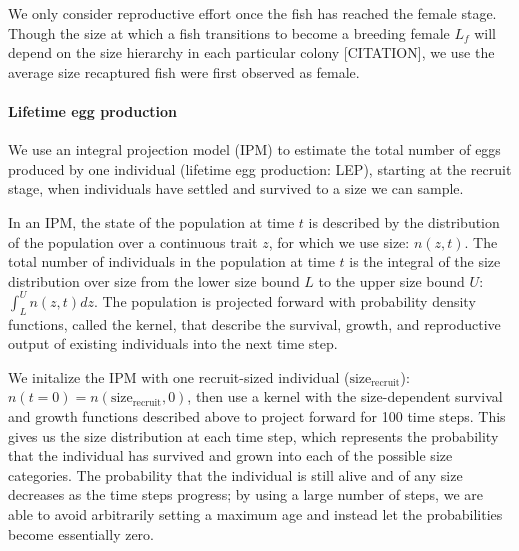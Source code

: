 \documentclass[12pt, oneside]{article}   	%
\begin{document}
We only consider reproductive effort once the fish has reached the female stage. Though the size at which a fish transitions to become a breeding female $L_f$ will depend on the size hierarchy in each particular colony [CITATION], we use the average size recaptured fish were first observed as female. 


\paragraph*{Lifetime egg production}
We use an integral projection model (IPM) \citep[e.g.][]{rees2014building} to estimate the total number of eggs produced by one individual (lifetime egg production: LEP), starting at the recruit stage, when individuals have settled and survived to a size we can sample.

In an IPM, the state of the population at time $t$ is described by the distribution of the population over a continuous trait $z$, for which we use size: $n(z,t)$. The total number of individuals in the population at time $t$ is the integral of the size distribution over size from the lower size bound $L$ to the upper size bound $U$: $\int_L^U n(z,t) dz$. The population is projected forward with probability density functions, called the kernel, that describe the survival, growth, and reproductive output of existing individuals into the next time step. 

We initalize the IPM with one recruit-sized individual ($\text{size}_\text{recruit}$): $n(t=0) = n(\text{size}_\text{recruit}, 0)$, then use a kernel with the size-dependent survival and growth functions described above to project forward for 100 time steps. This gives us the size distribution at each time step, which represents the probability that the individual has survived and grown into each of the possible size categories. The probability that the individual is still alive and of any size decreases as the time steps progress; by using a large number of steps, we are able to avoid arbitrarily setting a maximum age and instead let the probabilities become essentially zero. 
\end{document}
